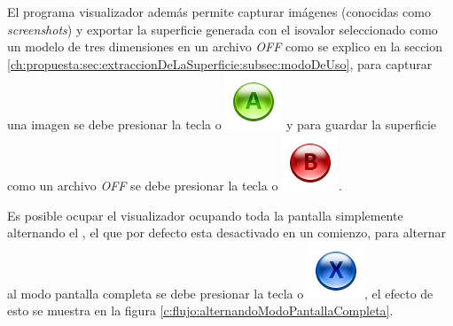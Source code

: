 El programa visualizador además permite capturar imágenes (conocidas como \emph{screenshots}) y exportar la superficie generada con el isovalor seleccionado como un modelo de tres dimensiones en un archivo \emph{OFF} como se explico en la seccion \ref{ch:propuesta:sec:extraccionDeLaSuperficie:subsec:modoDeUso}, para capturar una imagen se debe presionar la tecla  o \includegraphics[scale=0.4, trim= 0 20 0 0]{images/visualizer/xbox360/faceButton0.png} y para guardar la superficie como un archivo \emph{OFF} se debe presionar la tecla  o \includegraphics[scale=0.4, trim= 0 20 0 0]{images/visualizer/xbox360/faceButton1.png}.

Es posible ocupar el visualizador ocupando toda la pantalla simplemente alternando el , el que por defecto esta desactivado en un comienzo, para alternar al modo pantalla completa se debe presionar la tecla  o \includegraphics[scale=0.4, trim= 0 20 0 0]{images/visualizer/xbox360/faceButton2.png}, el efecto de esto se muestra en la figura \ref{c:flujo:alternandoModoPantallaCompleta}.

